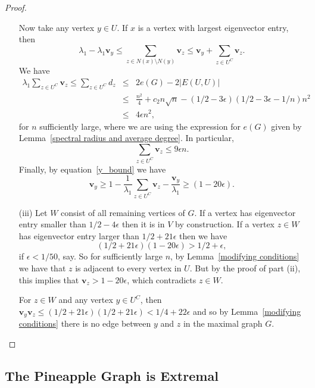 \begin{proof}
\begin{itemize}
Now take any vertex $y \in U$.  If $x$ is a vertex with largest eigenvector entry, then 
\begin{equation}\label{y_bound}
 \lambda_1 - \lambda_1 \mathbf{v}_y \leq \sum_{z \in N(x) \setminus N(y)} \mathbf{v}_z \leq \mathbf{v}_y + \sum_{z \in U^C} \mathbf{v}_z . 
\end{equation}
We have
 \begin{eqnarray*}
  \lambda_1 \sum_{z \in U^C} \mathbf{v}_z \leq \sum_{z \in U^C} d_z &\leq& 2e(G) - 2|E(U,U)|\\
   &\leq& \frac{n^2}{4} + c_2 n \sqrt{n} - (1/2 - 3\epsilon)(1/2 - 3 \epsilon - 1/n) n^2 \\
   &\leq & 4 \epsilon n^2 ,
 \end{eqnarray*}
for $n$ sufficiently large, where we are using the expression for $e(G)$ given by Lemma~\ref{spectral radius and average degree}.
In particular,
 \[ \sum_{z \in U^C} \mathbf{v}_z \leq 9 \epsilon n .\] 
Finally, by equation~\ref{y_bound} we have 
 \[ \mathbf{v}_y \geq 1 - \frac{1}{\lambda_1} \sum_{z \in U^C} \mathbf{v}_z -\frac{\mathbf{v}_y}{\lambda_1} \geq (1 - 20 \epsilon) .\]
 
\item[(iii)] Let $W$ consist of all remaining vertices of $G$.  If a vertex 
has eigenvector entry smaller than $1/2 - 4\epsilon$ then it is in $V$ by
construction.  If a vertex $z \in W$ has eigenvector entry larger than $1/2 + 21\epsilon$
then we have
 \[ (1/2 + 21 \epsilon) (1 - 20 \epsilon) > 1/2 + \epsilon, \]
if $\epsilon < 1/50$, say.   So for sufficiently large $n$, by Lemma~\ref{modifying conditions} we 
have that $z$ is adjacent to every vertex in $U$.  But by the proof of part (ii), this implies that $\mathbf{v}_z > 1 - 20\epsilon$, which contradicts $z \in W$.

For $z \in W$ and any vertex $y \in U^C$, then 
 $\mathbf{v}_y\mathbf{v}_z \leq (1/2 + 21 \epsilon)(1/2 + 21\epsilon) < 1/4 + 22 \epsilon$
and so by Lemma~\ref{modifying conditions} there is no edge between $y$ and 
$z$ in the maximal graph $G$.
\end{itemize}
\end{proof}

\subsection{The Pineapple Graph is Extremal}

